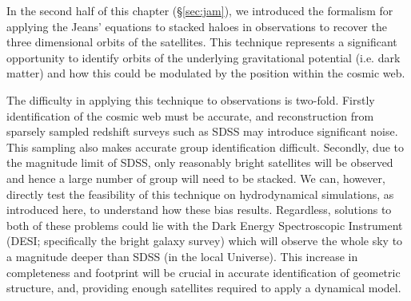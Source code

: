 In the second half of this chapter (\S\ref{sec:jam}), we introduced the formalism for applying the Jeans' equations to stacked haloes in observations to recover the three dimensional orbits of the satellites. This technique represents a significant opportunity to identify orbits of the underlying gravitational potential (i.e. dark matter) and how this could be modulated by the position within the cosmic web.

The difficulty in applying this technique to observations is two-fold. Firstly identification of the cosmic web must be accurate, and reconstruction from sparsely sampled redshift surveys such as SDSS may introduce significant noise. This sampling also makes accurate group identification difficult. Secondly, due to the magnitude limit of SDSS, only reasonably bright satellites will be observed and hence a large number of group will need to be stacked. We can, however, directly test the feasibility of this technique on hydrodynamical simulations, as introduced here, to understand how these bias results. Regardless, solutions to both of these problems could lie with the Dark Energy Spectroscopic Instrument (DESI; specifically the bright galaxy survey) which will observe the whole sky to a magnitude deeper than SDSS (in the local Universe). This increase in completeness and footprint will be crucial in accurate identification of geometric structure, and, providing enough satellites required to apply a dynamical model. 